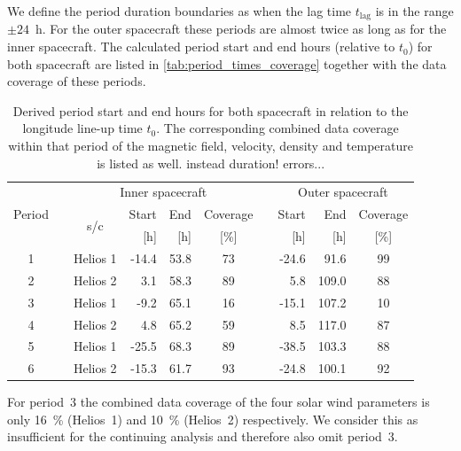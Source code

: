 We define the period duration boundaries as when the lag time $t_\text{lag}$ is in the range $\pm24$~h. For the outer spacecraft these periods are almost twice as long as for the inner spacecraft. The calculated period start and end hours (relative to $t_0$) for both spacecraft are listed in \autoref{tab:period_times_coverage} together with the data coverage of these periods.
\begin{table}[htb]\small
	\centering
	\captionsetup{belowskip=4pt}
	\caption{Derived period start and end hours for both spacecraft in relation to the longitude line-up time $t_0$. The corresponding combined data coverage within that period of the magnetic field, velocity, density and temperature is listed as well. instead duration! errors...}
	\begin{tabular}{cccrrccrrc}
		\toprule
		\multirow{3}{*}{Period}	&	&\multicolumn{4}{c}{Inner spacecraft}	&	&\multicolumn{3}{c}{Outer spacecraft}\\
		\cmidrule{3-6}	\cmidrule{8-10}
			&	&\multirow{2}{*}{s/c}	&Start	&End	&Coverage	&	&Start	&End	&Coverage\\
			&	&	&[h]	&[h]	&[\%]	&	&[h]	&[h]	&[\%]\\
		\midrule
		1	&	&Helios 1	&-14.4	&53.8	&73	&	&-24.6	&91.6	&99\\
		2	&	&Helios 2	&3.1	&58.3	&89	&	&5.8	&109.0	&88\\
		3	&	&Helios 1	&-9.2	&65.1	&16	&	&-15.1	&107.2	&10\\
		4	&	&Helios 2	&4.8	&65.2	&59	&	&8.5	&117.0	&87\\
		5	&	&Helios 1	&-25.5	&68.3	&89	&	&-38.5	&103.3	&88\\
		6	&	&Helios 2	&-15.3	&61.7	&93	&	&-24.8	&100.1	&92\\
		\bottomrule
	\end{tabular}
	\label{tab:period_times_coverage}
\end{table}

For period~3 the combined data coverage of the four solar wind parameters is only 16~\% (Helios~1) and 10~\% (Helios~2) respectively. We consider this as insufficient for the continuing analysis and therefore also omit period~3.\\

